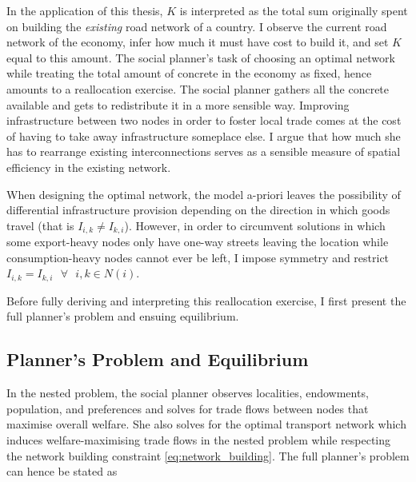 \documentclass[11pt, oneside]{article}   	%
\begin{document}
In the application of this thesis, $K$ is interpreted as the total sum originally spent on building the \emph{existing} road network of a country. I observe the current road network of the economy, infer how much it must have cost to build it, and set $K$ equal to this amount. The social planner's task of choosing an optimal network while treating the total amount of concrete in the economy as fixed, hence amounts to a reallocation exercise. The social planner gathers all the concrete available and gets to redistribute it in a more sensible way. Improving infrastructure between two nodes in order to foster local trade comes at the cost of having to take away infrastructure someplace else. I argue that how much she has to rearrange existing interconnections serves as a sensible measure of spatial efficiency in the existing network.

When designing the optimal network, the model a-priori leaves the possibility of differential infrastructure provision depending on the direction in which goods travel (that is $I_{i,k} \neq I_{k,i}$). However, in order to circumvent solutions in which some export-heavy nodes only have one-way streets leaving the location while consumption-heavy nodes cannot ever be left, I impose symmetry and restrict $I_{i,k} = I_{k,i} \textrm{ } \forall \textrm{ } i,k\in N(i)$.

Before fully deriving and interpreting this reallocation exercise, I first present the full planner's problem and ensuing equilibrium.

\subsection{Planner's Problem and Equilibrium}
In the nested problem, the social planner observes localities, endowments, population, and preferences and solves for trade flows between nodes that maximise overall welfare. She also solves for the optimal transport network which induces welfare-maximising trade flows in the nested problem while respecting the network building constraint \eqref{eq:network_building}. The full planner's problem can hence be stated as
\end{document}
